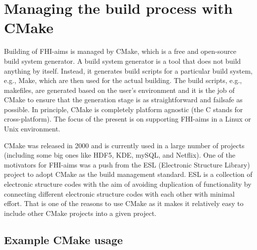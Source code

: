 \section{Managing the build process with CMake}
\label{Sec:build-cmake}

Building of FHI-aims is managed by CMake, which is a free and open-source build system generator. A build system generator is a tool that does not build anything by itself. Instead, it generates build scripts for a particular build system, e.g., Make, which are then used for the actual building. The build scripts, e.g., makefiles, are generated based on the user's environment and it is the job of CMake to ensure that the generation stage is as straightforward and failsafe as possible. In principle, CMake is completely platform agnostic (the C stands for cross-platform). The focus of the present is on supporting FHI-aims in a Linux or Unix environment.

CMake was released in 2000 and is currently used in a large number of projects (including some big ones like HDF5, KDE, mySQL, and Netflix). One of the motivators for FHI-aims was a push from the ESL (Electronic Structure Library) project to adopt CMake as the build management standard. ESL is a collection of electronic structure codes with the aim of avoiding duplication of functionality by connecting different electronic structure codes with each other with minimal effort. That is one of the reasons to use CMake as it makes it relatively easy to include other CMake projects into a given project.

\subsection{\label{sec:minimal_cmake}Example CMake usage}

